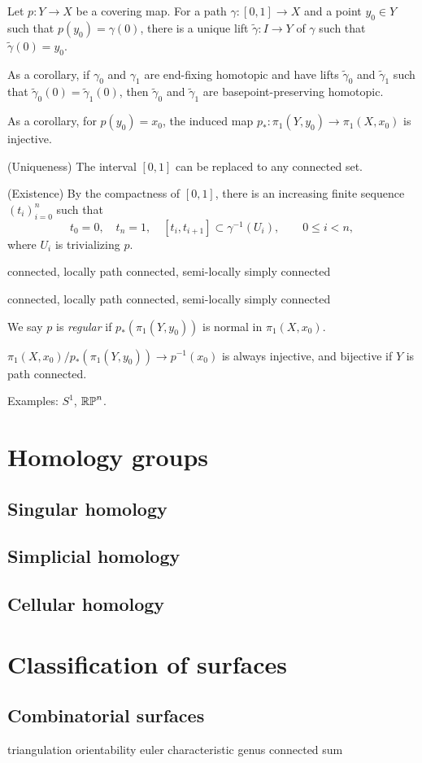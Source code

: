 \documentclass{../../large}
\begin{document}
\begin{prb}
Let $p:Y\to X$ be a covering map.
For a path $\gamma:[0,1]\to X$ and a point $y_0\in Y$ such that $p(y_0)=\gamma(0)$, there is a unique lift $\tilde\gamma:I\to Y$ of $\gamma$ such that $\tilde\gamma(0)=y_0$.

As a corollary, if $\gamma_0$ and $\gamma_1$ are end-fixing homotopic and have lifts $\tilde\gamma_0$ and $\tilde\gamma_1$ such that $\tilde\gamma_0(0)=\tilde\gamma_1(0)$, then $\tilde\gamma_0$ and $\tilde\gamma_1$ are basepoint-preserving homotopic.

As a corollary, for $p(y_0)=x_0$, the induced map $p_*:\pi_1(Y,y_0)\to\pi_1(X,x_0)$ is injective.
\end{prb}
\begin{pf}

(Uniqueness)
The interval $[0,1]$ can be replaced to any connected set.

(Existence)
By the compactness of $[0,1]$, there is an increasing finite sequence $(t_i)_{i=0}^n$ such that
\[t_0=0,\quad t_n=1,\quad[t_i,t_{i+1}]\subset\gamma^{-1}(U_i),\qquad 0\le i<n,\]
where $U_i$ is trivializing $p$.


\end{pf}

\begin{prb}
connected, locally path connected, semi-locally simply connected

\end{prb}

\begin{prb}
connected, locally path connected, semi-locally simply connected

We say $p$ is \emph{regular} if $p_*(\pi_1(Y,y_0))$ is normal in $\pi_1(X,x_0)$.

$\pi_1(X,x_0)/p_*(\pi_1(Y,y_0))\to p^{-1}(x_0)$ is always injective, and bijective if $Y$ is path connected.
\end{prb}


Examples: $S^1$, $\mathbb{RP}^n$.



\chapter{Homology groups}
\section{Singular homology}
\section{Simplicial homology}
\section{Cellular homology}



\chapter{Classification of surfaces}
\section{Combinatorial surfaces}

triangulation
orientability
euler characteristic
genus
connected sum
\end{document}
